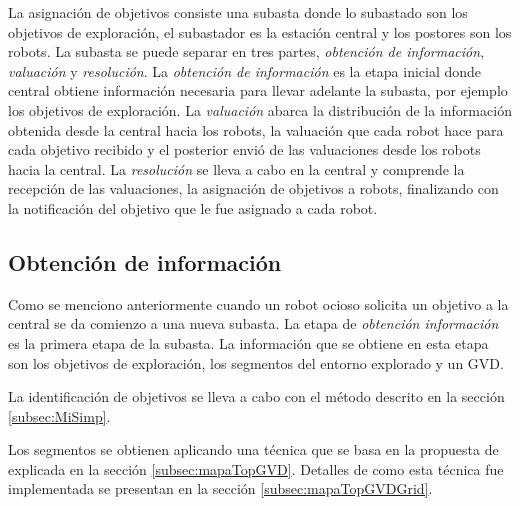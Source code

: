 La asignación de objetivos consiste una subasta donde lo subastado son los
objetivos de exploración, el subastador es la estación central y los postores
son los robots. La subasta se puede separar en tres partes, \emph{obtención de
  información}, \emph{valuación} y \emph{resolución}. La \emph{obtención de
información} es la etapa inicial donde central obtiene información necesaria
para llevar adelante la subasta, por ejemplo los objetivos de exploración. La
\emph{valuación} abarca la distribución de la información obtenida desde la
central hacia los robots, la valuación que cada robot hace para cada objetivo
recibido y el posterior envió de las valuaciones desde los robots hacia la
central. La \emph{resolución} se lleva a cabo en la central y comprende la
recepción de las valuaciones, la asignación de objetivos a robots, finalizando
con la notificación del objetivo que le fue asignado a cada robot.



\subsection{Obtención de información}\label{subsec:obtInfo}
Como se menciono anteriormente cuando un robot ocioso solicita un objetivo a la
central se da comienzo a una nueva subasta. La etapa de \emph{obtención
información} es la primera etapa de la subasta. La información que se obtiene
en esta etapa son los objetivos de exploración, los segmentos del entorno
explorado y un GVD.

La identificación de objetivos se lleva a cabo con el método descrito en la
sección \ref{subsec:MiSimp}.

Los segmentos se obtienen aplicando una técnica que se basa en la propuesta de
\cite{Thrun1998} explicada en la sección \ref{subsec:mapaTopGVD}. Detalles de
como esta técnica fue implementada se presentan en la sección
\ref{subsec:mapaTopGVDGrid}. 

